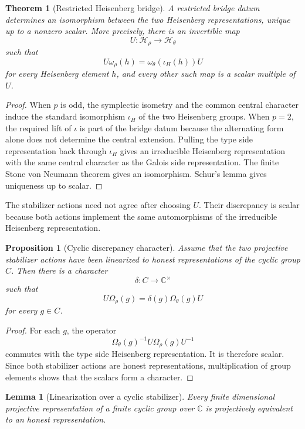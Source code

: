 \documentclass[11pt]{amsart}
\newtheorem{theorem}{Theorem}[section]
\newtheorem{proposition}[proposition]{Proposition}
\newtheorem{lemma}[lemma]{Lemma}
\theoremstyle{definition}
\theoremstyle{remark}
\newcommand{\CC}{\mathbb C}
\newcommand{\calH}{\mathcal H}
\begin{document}
\begin{theorem}[Restricted Heisenberg bridge]\label{thm:restricted_bridge}
A restricted bridge datum determines an isomorphism between the two Heisenberg representations, unique up to a nonzero scalar. More precisely, there is an invertible map
\[
U:\calH_\rho\longrightarrow\calH_\theta
\]
such that
\[
U\omega_\rho(h)
=
\omega_\theta(\iota_H(h))U
\]
for every Heisenberg element \(h\), and every other such map is a scalar multiple of \(U\).
\end{theorem}

\begin{proof}
When \(p\) is odd, the symplectic isometry and the common central character induce the standard isomorphism \(\iota_H\) of the two Heisenberg groups. When \(p=2\), the required lift of \(\iota\) is part of the bridge datum because the alternating form alone does not determine the central extension. Pulling the type side representation back through \(\iota_H\) gives an irreducible Heisenberg representation with the same central character as the Galois side representation. The finite Stone von Neumann theorem gives an isomorphism. Schur's lemma gives uniqueness up to scalar.
\end{proof}

The stabilizer actions need not agree after choosing \(U\). Their discrepancy is scalar because both actions implement the same automorphisms of the irreducible Heisenberg representation.

\begin{proposition}[Cyclic discrepancy character]\label{prop:cyclic_discrepancy}
Assume that the two projective stabilizer actions have been linearized to honest representations of the cyclic group \(C\). Then there is a character
\[
\delta:C\to\CC^{\times}
\]
such that
\[
U\Omega_\rho(g)
=
\delta(g)\Omega_\theta(g)U
\]
for every \(g\in C\).
\end{proposition}

\begin{proof}
For each \(g\), the operator
\[
\Omega_\theta(g)^{-1}U\Omega_\rho(g)U^{-1}
\]
commutes with the type side Heisenberg representation. It is therefore scalar. Since both stabilizer actions are honest representations, multiplication of group elements shows that the scalars form a character.
\end{proof}

\begin{lemma}[Linearization over a cyclic stabilizer]\label{lem:cyclic_linearization}
Every finite dimensional projective representation of a finite cyclic group over \(\CC\) is projectively equivalent to an honest representation.
\end{lemma}
\end{document}
